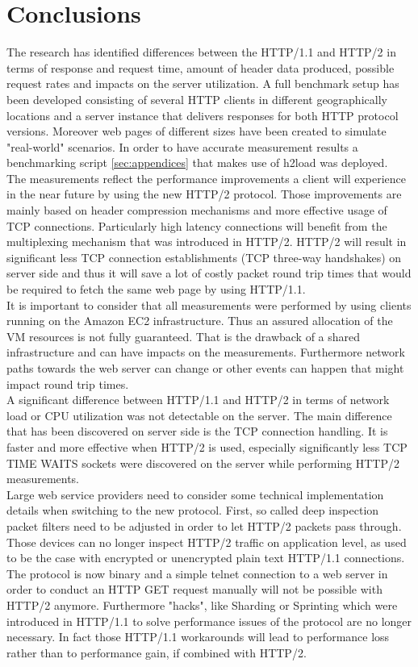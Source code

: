 \section{Conclusions}
\label{conclusion}

The research has identified differences between the HTTP/1.1 and HTTP/2 in terms of response and request time, amount of header data produced, possible request rates and impacts on the server utilization. A full benchmark setup has been developed consisting of several HTTP clients in different geographically locations and a server instance that delivers responses for both HTTP protocol versions. Moreover web pages of different sizes have been created to simulate "real-world" scenarios. In order to have accurate measurement results a benchmarking script \ref{sec:appendices} that makes use of h2load \cite{h2load} was deployed. 
\\
The measurements reflect the performance improvements a client will experience in the near future by using the new HTTP/2 protocol. Those improvements are mainly based on header compression mechanisms and more effective usage of TCP connections. Particularly high latency connections will benefit from the multiplexing mechanism that was introduced in HTTP/2. HTTP/2 will result in significant less TCP connection establishments (TCP three-way handshakes) on server side and thus it will save a lot of costly packet round trip times that would be required to fetch the same web page by using HTTP/1.1.
\\
It is important to consider that all measurements were performed by using clients running on the Amazon EC2 infrastructure. Thus an assured allocation of the VM resources is not fully guaranteed. That is the drawback of a shared infrastructure and can have impacts on the measurements. Furthermore network paths towards the web server can change or other events can happen that might impact round trip times.  
\\
A significant difference between HTTP/1.1 and HTTP/2 in terms of network load or CPU utilization was not detectable on the server. The main difference that has been discovered on server side is the TCP connection handling. It is faster and more effective when HTTP/2 is used, especially significantly less TCP TIME WAITS sockets were discovered on the server while performing HTTP/2 measurements.
\\
Large web service providers need to consider some technical implementation details when switching to the new protocol. First, so called deep inspection packet filters need to be adjusted in order to let HTTP/2 packets pass through. Those devices can no longer inspect HTTP/2 traffic on application level, as used to be the case with encrypted or unencrypted plain text HTTP/1.1 connections. The protocol is now binary and a simple telnet connection to a web server in order to conduct an HTTP GET request manually will not be possible with HTTP/2 anymore. Furthermore "hacks", like Sharding or Sprinting which were introduced in HTTP/1.1 to solve performance issues of the protocol are no longer necessary. In fact those HTTP/1.1 workarounds will lead to performance loss rather than to performance gain, if combined with HTTP/2.    

